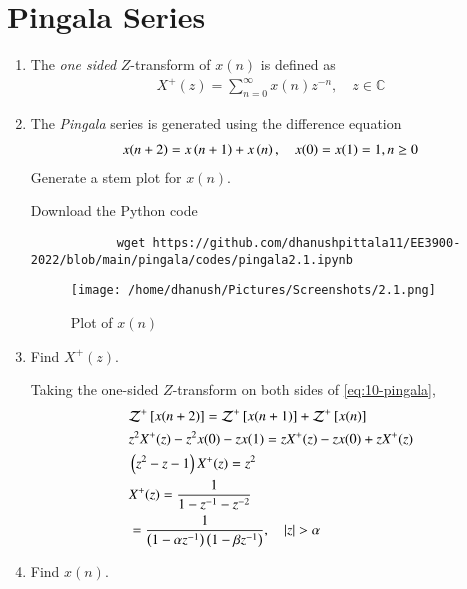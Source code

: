 \documentclass[journal,12pt,twocolumn]{IEEEtran}
\renewcommand\thesection{\arabic{section}}
\begin{document}
	\section{Pingala Series}
	\begin{enumerate}[label=\thesection.\arabic*,ref=\thesection.\theenumi]
		\item The {\em one sided} $Z$-transform of $x(n)$ is defined as 
		\begin{align}
			X^{+}(z) = \sum_{n = 0}^{\infty}x(n)z^{-n}, \quad z \in \mathbb{C}
			\label{eq:one-Z}
		\end{align}
		\item The {\em Pingala} series is generated using the difference equation 
		\begin{align}
			x(n+2) = x\left(n+1\right) + x\left(n\right),  \quad x(0) = x(1) = 1, n \ge 0
			\label{eq:10-pingala}
		\end{align}
		Generate a stem plot for $x(n)$.
		
		\solution
		Download the Python code
		\begin{lstlisting}
			wget https://github.com/dhanushpittala11/EE3900-2022/blob/main/pingala/codes/pingala2.1.ipynb
		\end{lstlisting}
		\begin{figure}[!htp]
			\texttt{[image: /home/dhanush/Pictures/Screenshots/2.1.png]}
			\caption{Plot of $x(n)$}
			\label{fig:xn}
		\end{figure}
		
		\newpage
		\item Find $X^{+}(z)$.
		
		\solution Taking the one-sided $Z$-transform on both sides of \eqref{eq:10-pingala},
		\begin{align}
			&\mathcal{Z}^+{}\left[x(n + 2)\right] = \mathcal{Z}^+{}\left[x(n + 1)\right] + \mathcal{Z}^+{}\left[x(n)\right] \\
			&z^2X^+(z) - z^2x(0) - zx(1) = zX^+(z) - zx(0) + zX^+(z) \\
			&\left(z^2 - z - 1\right)X^+(z) = z^2 \\
			&X^+(z) = \frac{1}{1 - z^{-1} - z^{-2}} \\
			&= \frac{1}{\left(1 - \alpha z^{-1}\right)\left(1 - \beta z^{-1}\right)}, \quad |z| > \alpha
			\label{eq:X-z}
		\end{align}
		\item Find $x(n)$.
		

\end{enumerate}
\end{document}
